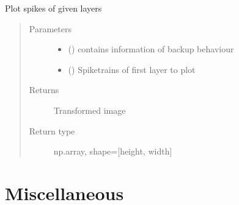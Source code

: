 \documentclass[letterpaper,10pt,english]{sphinxmanual}
\begin{document}
\begin{fulllineitems}
\label{\detokenize{SpikingConvNet:SpikingConvNet.utils.plot_spikes}}
Plot spikes of given layers
\begin{quote}\begin{description}
\item[{Parameters}] \leavevmode\begin{itemize}
\item {} 
 () \textendash{} contains information of backup behaviour

\item {} 
 () \textendash{} Spiketrains of first layer to plot

\end{itemize}

\item[{Returns}] \leavevmode
{} \textendash{} Transformed image

\item[{Return type}] \leavevmode
np.array, shape={[}height, width{]}

\end{description}\end{quote}

\end{fulllineitems}



\chapter{Miscellaneous}
\label{\detokenize{misc::doc}}\label{\detokenize{misc:miscellaneous}}
\end{document}
